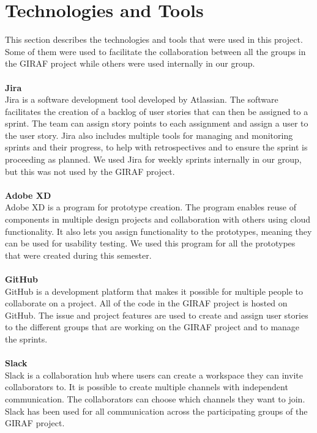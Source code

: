 \section{Technologies and Tools}\label{technologies-and-tools}
This section describes the technologies and tools that were used in this project. 
Some of them were used to facilitate the collaboration between all the groups in the GIRAF project while others were used internally in our group.
\\\\
\textbf{Jira}\\
Jira is a software development tool developed by Atlassian.
The software facilitates the creation of a backlog of user stories that can then be assigned to a sprint.
The team can assign story points to each assignment and assign a user to the user story.
Jira also includes multiple tools for managing and monitoring sprints and their progress, to help with retrospectives and to ensure the sprint is proceeding as planned.
We used Jira for weekly sprints internally in our group, but this was not used by the GIRAF project.
\\\\
\textbf{Adobe XD}\\
Adobe XD is a program for prototype creation.
The program enables reuse of components in multiple design projects and collaboration with others using cloud functionality.
It also lets you assign functionality to the prototypes, meaning they can be used for usability testing.
We used this program for all the prototypes that were created during this semester.
\\\\
\textbf{GitHub}\\
GitHub is a development platform that makes it possible for multiple people to collaborate on a project. 
All of the code in the GIRAF project is hosted on GitHub.
The issue and project features are used to create and assign user stories to the different groups that are working on the GIRAF project and to manage the sprints. 
\\\\
\textbf{Slack}\\
Slack is a collaboration hub where users can create a workspace they can invite collaborators to.
It is possible to create multiple channels with independent communication. 
The collaborators can choose which channels they want to join.
Slack has been used for all communication across the participating groups of the GIRAF project.
